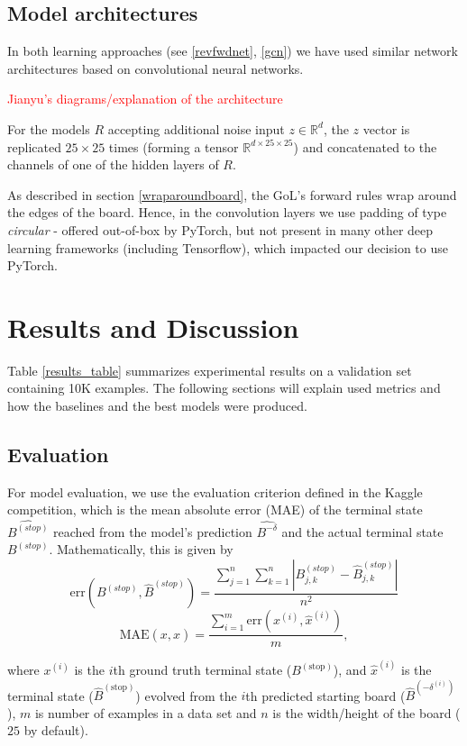\documentclass[conference]{IEEEtran}
\newcommand\todo[1]{\textcolor{red}{#1}}
\begin{document}
\subsection{Model architectures}
In both learning approaches (see \ref{revfwdnet}, \ref{gcn}) we have used similar network architectures based on convolutional neural networks.

\todo{Jianyu's diagrams/explanation of the architecture}

For the models $R$ accepting additional noise input $z \in \mathbb{R}^d$, the $z$ vector is replicated $25 \times 25$ times (forming a tensor $\mathbb{R}^{d\times25\times25}$) and concatenated to the channels of one of the hidden layers of $R$.

As described in section \ref{wraparoundboard}, the GoL's forward rules wrap around the edges of the board. Hence, in the convolution layers we use padding of type {\it circular} - offered out-of-box by PyTorch, but not present in many other deep learning frameworks (including Tensorflow), which impacted our decision to use PyTorch.


\section{Results and Discussion}
\label{results}
Table \ref{results_table} summarizes experimental results on a validation set containing 10K examples. The following sections will explain used metrics and how the baselines and the best models were produced.

\subsection{Evaluation}
\label{evaluation}
For model evaluation, we use the evaluation criterion defined in the Kaggle competition, which is the mean absolute error (MAE) of the terminal state $\hat{B^{(stop)}}$ reached from the model's prediction $\hat{B^{-\delta}}$ and the actual terminal state $B^{(stop)}$. Mathematically, this is given by
$$\mathrm{err}(B^{(stop)}, \hat B^{(stop)}) = \frac{ \sum_{j=1}^{n}\sum_{k=1}^{n}|B_{j,k}^{(stop)} - \hat B_{j,k}^{(stop)}|}{n^2}$$
$$\mathrm{MAE}(x, \hat x) = \frac{\sum_{i=1}^{m} \mathrm{err}(x^{(i)}, \hat x^{(i)})}{m},$$


where $x^{(i)}$ is the $i$th ground truth terminal state ($B^{(\text{stop})}$), and $\hat x^{(i)}$ is the terminal state ($\hat B^{(\text{stop})}$) evolved from the $i$th predicted starting board ($\hat B^{(-\delta^{(i)})}$), $m$ is number of examples in a data set and $n$ is the width/height of the board ($25$ by default).
\end{document}
